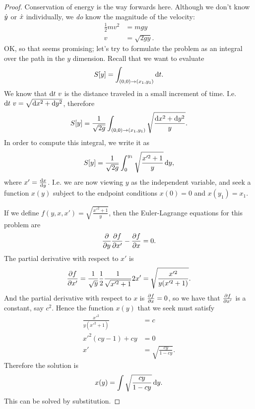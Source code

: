 \begin{proof}
  Conservation of energy is the way forwards here. Although we don't know $\dot{y}$ or $\dot{x}$ individually, we \textit{do}
  know the magnitude of the velocity:
  \begin{align*}
    \frac{1}{2}mv^2 &= mgy \\
    v               &= \sqrt{2gy}.
  \end{align*}
  OK, so that seems promising; let's try to formulate the problem as an integral over the path in the $y$
  dimension. Recall that we want to evaluate
  \begin{align*}
    S[y] = \int_{(0, 0) \to (x_1, y_1)} \dt.
  \end{align*}
  We know that $\dt ~ v$ is the distance traveled in a small increment of time. I.e. $\dt ~ v = \sqrt{\dx^2 + \dy^2}$, therefore
  \begin{align*}
    S[y] = \frac{1}{\sqrt{2g}}\int_{(0, 0) \to (x_1, y_1)} \sqrt{\frac{\dx^2 + \dy^2}{y}}.
  \end{align*}
  In order to compute this integral, we write it as
  \begin{align*}
    S[y] = \frac{1}{\sqrt{2g}}\int_{0}^{y_1} \sqrt{\frac{x'^2 + 1}{y}}\dy,
  \end{align*}
  where $x' = \frac{\dx}{\dy}$. I.e. we are now viewing $y$ as the independent variable, and seek a function
  $x(y)$ subject to the endpoint conditions $x(0) = 0$ and $x(y_1) = x_1$.

  If we define $f(y, x, x') = \sqrt{\frac{x'^2 + 1}{y}}$, then the Euler-Lagrange equations for this problem are
  \begin{align*}
    \frac{\partial}{\partial y} \frac{\partial f}{\partial x'} - \frac{\partial f}{\partial x} = 0.
  \end{align*}
  The partial derivative with respect to $x'$ is
  \begin{align*}
    \frac{\partial f}{\partial x'} = \frac{1}{\sqrt{y}} \frac{1}{2}\frac{1}{\sqrt{x'^2 + 1}}2x' = \sqrt{\frac{x'^2}{y(x'^2 + 1)}}.
  \end{align*}
  And the partial derivative with respect to $x$ is $\frac{\partial f}{\partial x} = 0$, so we have that $\frac{\partial f}{\partial x'}$ is a constant,
  say $c^2$. Hence the function $x(y)$ that we seek must satisfy
  \begin{align*}
    \frac{x'^2}{y(x'^2 + 1)} &= c \\
    x'^2(cy - 1) + cy       &= 0 \\
    x'                     &= \sqrt{\frac{cy}{1 - cy}}.
  \end{align*}
  Therefore the solution is
  \begin{align*}
    x(y) = \int \sqrt{\frac{cy}{1 - cy}} \dy.
  \end{align*}
  This can be solved by substitution.


\end{proof}

